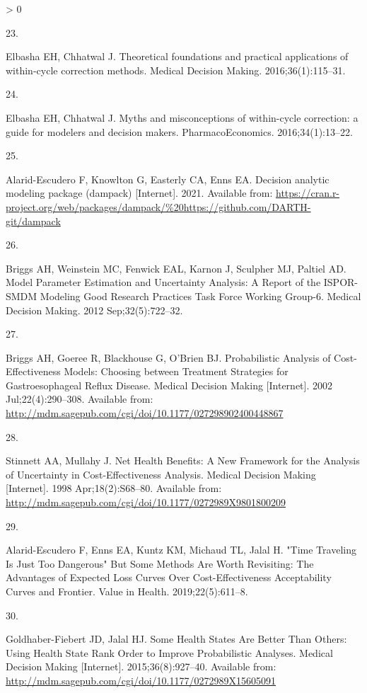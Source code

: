 \documentclass[
]{article}
\newlength{\cslhangindent}
\newlength{\csllabelwidth}
\newenvironment{CSLReferences}[2] %
 {%
  \setlength{\parindent}{0pt}
  \ifodd #1 \everypar{\setlength{\hangindent}{\cslhangindent}}\ignorespaces\fi
  \ifnum #2 > 0
  \setlength{\parskip}{#2\baselineskip}
  \fi
 }%
 {}
\newcommand{\CSLLeftMargin}[1]{\parbox[t]{\csllabelwidth}{#1}}
\newcommand{\CSLRightInline}[1]{\parbox[t]{\linewidth - \csllabelwidth}{#1}\break}
\begin{document}
\begin{CSLReferences}{0}{0}
\leavevmode\hypertarget{ref-Elbasha2016}{}%
\CSLLeftMargin{23. }
\CSLRightInline{Elbasha EH, Chhatwal J. {Theoretical foundations and practical applications of within-cycle correction methods}. Medical Decision Making. 2016;36(1):115--31. }

\leavevmode\hypertarget{ref-Elbasha2016a}{}%
\CSLLeftMargin{24. }
\CSLRightInline{Elbasha EH, Chhatwal J. {Myths and misconceptions of within-cycle correction: a guide for modelers and decision makers}. PharmacoEconomics. 2016;34(1):13--22. }

\leavevmode\hypertarget{ref-Alarid-Escudero2021}{}%
\CSLLeftMargin{25. }
\CSLRightInline{Alarid-Escudero F, Knowlton G, Easterly CA, Enns EA. Decision analytic modeling package (dampack) {[}Internet{]}. 2021. Available from: \url{https://cran.r-project.org/web/packages/dampack/\%20https://github.com/DARTH-git/dampack}}

\leavevmode\hypertarget{ref-Briggs2012}{}%
\CSLLeftMargin{26. }
\CSLRightInline{Briggs AH, Weinstein MC, Fenwick EAL, Karnon J, Sculpher MJ, Paltiel AD. {Model Parameter Estimation and Uncertainty Analysis: A Report of the ISPOR-SMDM Modeling Good Research Practices Task Force Working Group-6.} Medical Decision Making. 2012 Sep;32(5):722--32. }

\leavevmode\hypertarget{ref-Briggs2002}{}%
\CSLLeftMargin{27. }
\CSLRightInline{Briggs AH, Goeree R, Blackhouse G, O'Brien BJ. {Probabilistic Analysis of Cost-Effectiveness Models: Choosing between Treatment Strategies for Gastroesophageal Reflux Disease}. Medical Decision Making {[}Internet{]}. 2002 Jul;22(4):290--308. Available from: \url{http://mdm.sagepub.com/cgi/doi/10.1177/027298902400448867}}

\leavevmode\hypertarget{ref-Stinnett1998b}{}%
\CSLLeftMargin{28. }
\CSLRightInline{Stinnett AA, Mullahy J. {Net Health Benefits: A New Framework for the Analysis of Uncertainty in Cost-Effectiveness Analysis}. Medical Decision Making {[}Internet{]}. 1998 Apr;18(2):S68--80. Available from: \url{http://mdm.sagepub.com/cgi/doi/10.1177/0272989X9801800209}}

\leavevmode\hypertarget{ref-Alarid-Escudero2019}{}%
\CSLLeftMargin{29. }
\CSLRightInline{Alarid-Escudero F, Enns EA, Kuntz KM, Michaud TL, Jalal H. {"Time Traveling Is Just Too Dangerous" But Some Methods Are Worth Revisiting: The Advantages of Expected Loss Curves Over Cost-Effectiveness Acceptability Curves and Frontier}. Value in Health. 2019;22(5):611--8. }

\leavevmode\hypertarget{ref-Goldhaber-Fiebert2015}{}%
\CSLLeftMargin{30. }
\CSLRightInline{Goldhaber-Fiebert JD, Jalal HJ. {Some Health States Are Better Than Others: Using Health State Rank Order to Improve Probabilistic Analyses}. Medical Decision Making {[}Internet{]}. 2015;36(8):927--40. Available from: \url{http://mdm.sagepub.com/cgi/doi/10.1177/0272989X15605091}}


\end{CSLReferences}
\end{document}
